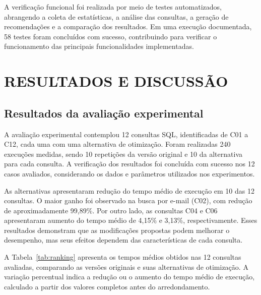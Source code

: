 \documentclass{UNESC}
\begin{document}
A verificação funcional foi realizada por meio de testes automatizados, abrangendo a coleta de estatísticas, a análise das consultas, a geração de recomendações e a comparação dos resultados. Em uma execução documentada, 58 testes foram concluídos com sucesso, contribuindo para verificar o funcionamento das principais funcionalidades implementadas.



\section{RESULTADOS E DISCUSSÃO}

\subsection{Resultados da avaliação experimental}

A avaliação experimental contemplou 12 consultas SQL, identificadas de C01 a C12, cada uma com uma alternativa de otimização. Foram realizadas 240 execuções medidas, sendo 10 repetições da versão original e 10 da alternativa para cada consulta. A verificação dos resultados foi concluída com sucesso nos 12 casos avaliados, considerando os dados e parâmetros utilizados nos experimentos.

As alternativas apresentaram redução do tempo médio de execução em 10 das 12 consultas. O maior ganho foi observado na busca por e-mail (C02), com redução de aproximadamente 99,89\%. Por outro lado, as consultas C04 e C06 apresentaram aumento do tempo médio de 4,15\% e 3,13\%, respectivamente. Esses resultados demonstram que as modificações propostas podem melhorar o desempenho, mas seus efeitos dependem das características de cada consulta.

A Tabela~\ref{tab:ranking} apresenta os tempos médios obtidos nas 12 consultas avaliadas, comparando as versões originais e suas alternativas de otimização. A variação percentual indica a redução ou o aumento do tempo médio de execução, calculado a partir dos valores completos antes do arredondamento.
\end{document}

